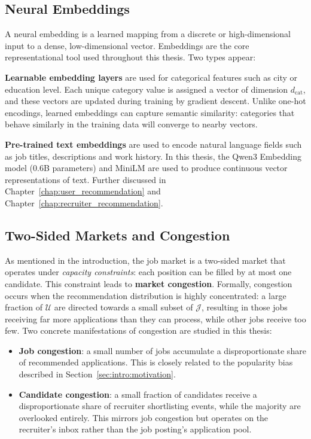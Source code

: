 \subsection{Neural Embeddings}
\label{sec:prelim_embeddings}

A neural embedding is a learned mapping from a discrete or high-dimensional input to a dense, low-dimensional vector. Embeddings are the core representational tool used throughout this thesis. Two types appear:

\textbf{Learnable embedding layers} are used for categorical features such as city or education level. Each unique category value is assigned a vector of dimension $d_{\text{cat}}$, and these vectors are updated during training by gradient descent. Unlike one-hot encodings, learned embeddings can capture semantic similarity: categories that behave similarly in the training data will converge to nearby vectors.

\textbf{Pre-trained text embeddings} are used to encode natural language fields such as job titles, descriptions and work history. In this thesis, the Qwen3 Embedding model (0.6B parameters) \cite{yang2025qwen3technicalreport} and MiniLM \cite{wang2020minilmdeepselfattentiondistillation} are used to produce continuous vector representations of text. Further discussed in Chapter~\ref{chap:user_recommendation} and Chapter~\ref{chap:recruiter_recommendation}.

\subsection{Two-Sided Markets and Congestion}
\label{sec:prelim_twosided}

As mentioned in the introduction, the job market is a two-sided market that operates under \emph{capacity constraints}: each position can be filled by at most one candidate. This constraint leads to \textbf{market congestion}. Formally, congestion occurs when the recommendation distribution is highly concentrated: a large fraction of $\mathcal{U}$ are directed towards a small subset of $\mathcal{J}$, resulting in those jobs receiving far more applications than they can process, while other jobs receive too few. Two concrete manifestations of congestion are studied in this thesis:

\begin{itemize}
    \item \textbf{Job congestion}: a small number of jobs accumulate a disproportionate share of recommended applications. This is closely related to the popularity bias described in Section~\ref{sec:intro:motivation}.
    \item \textbf{Candidate congestion}: a small fraction of candidates 
    receive a disproportionate share of recruiter shortlisting events, while 
    the majority are overlooked entirely. This mirrors job congestion but 
    operates on the recruiter's inbox rather than the job posting's application 
    pool.
\end{itemize}



